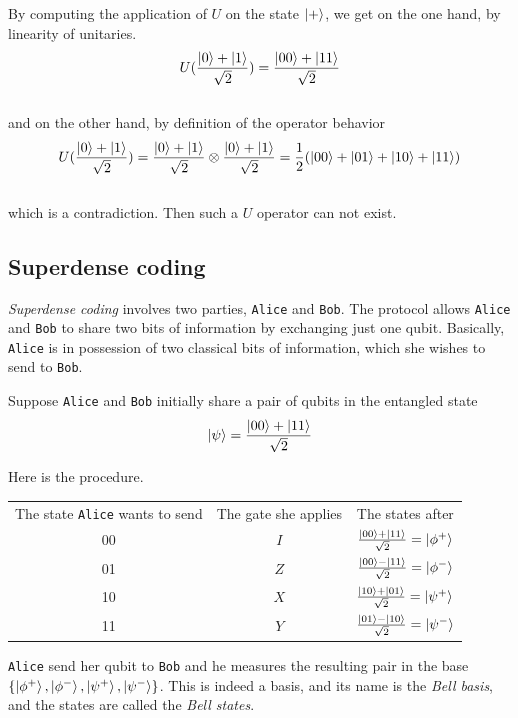 \documentclass{article}
\begin{document}
By computing the application of $U$ on the state $\ket{+}$, we get on the one
hand, by linearity of unitaries.
\begin{equation}
    U(\frac{\ket{0}+\ket{1}}{\sqrt{2}}) = \frac{\ket{00}+\ket{11}}{\sqrt{2}}
\end{equation}
\\
and on the other hand, by definition of the operator behavior
\begin{equation}
    U(\frac{\ket{0}+\ket{1}}{\sqrt{2}}) = \frac{\ket{0}+\ket{1}}{\sqrt{2}}
    \otimes \frac{\ket{0}+\ket{1}}{\sqrt{2}}
    =\frac{1}{2}(\ket{00}+\ket{01}+\ket{10}+\ket{11})
\end{equation}
\\
which is a contradiction. Then such a $U$ operator can not exist.

\subsection{Superdense coding}
\textit{Superdense coding} involves two parties, \texttt{Alice} and
\texttt{Bob}. The protocol allows \texttt{Alice} and \texttt{Bob} to share two
bits of information by exchanging just one qubit. Basically, \texttt{Alice} is
in possession of two classical bits of information, which she wishes to send to
\texttt{Bob}.

Suppose \texttt{Alice} and \texttt{Bob} initially share a pair of qubits in the
entangled state
\begin{equation}
    \ket{\psi} = \frac{\ket{00} + \ket{11}}{\sqrt{2}}
\end{equation}

Here is the procedure.

\begin{table}[h]
    \centering
    \begin{tabular}{c|c|c}
    The state \texttt{Alice} wants to send & The gate she applies & The states
    after \\
    00 & $I$ & $\frac{\ket{00} + \ket{11}}{\sqrt{2}} = \ket{\phi^+}$  \\
    01 & $Z$ & $\frac{\ket{00} - \ket{11}}{\sqrt{2}} = \ket{\phi^-}$ \\
    10 & $X$ & $\frac{\ket{10} + \ket{01}}{\sqrt{2}} = \ket{\psi^+}$ \\
    11 & $Y$ & $\frac{\ket{01} - \ket{10}}{\sqrt{2}} = \ket{\psi^-}$
    \end{tabular}
\end{table}

\texttt{Alice} send her qubit to \texttt{Bob} and he measures the resulting pair
in the base \\
$\{\ket{\phi^+}, \ket{\phi^-},\ket{\psi^+}, \ket{\psi^-}\}$. This is indeed a
basis, and its name is the \textit{Bell basis}, and the states are called the
\textit{Bell states}.
\end{document}
